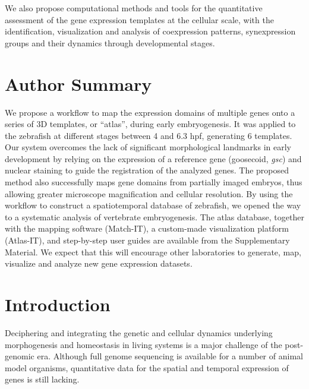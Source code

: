 We also propose computational methods and tools for the quantitative assessment of the gene expression templates at the cellular scale, with the identification, visualization and analysis of coexpression patterns, synexpression groups and their dynamics through developmental stages.






\section*{Author Summary}



We propose a workflow to map the expression domains of multiple genes onto a series of 3D templates, or ``atlas'', during early embryogenesis. It was applied to the zebrafish at different stages between 4 and 6.3 hpf, generating 6 templates. Our system overcomes the lack of significant morphological landmarks in early development by relying on the expression of a reference gene (goosecoid, \emph{gsc}) and nuclear staining to guide the registration of the analyzed genes. The proposed method also successfully maps gene domains from partially imaged embryos, thus allowing greater microscope magnification and cellular resolution. By using the workflow to construct a spatiotemporal database of zebrafish, we opened the way to a systematic analysis of vertebrate embryogenesis. The atlas database, together with the mapping software (Match-IT), a custom-made visualization platform (Atlas-IT), and step-by-step user guides are available from the Supplementary Material. We expect that this will encourage other laboratories to generate, map, visualize and analyze new gene expression datasets.



\section*{Introduction}



Deciphering and integrating the genetic and cellular dynamics underlying morphogenesis and homeostasis in living systems is a major challenge of the post-genomic era. Although full genome sequencing is available for a number of animal model organisms\cite{schier2005molecular}, quantitative data for the spatial and temporal expression of genes is still lacking\cite{oates2009quantitative}.



